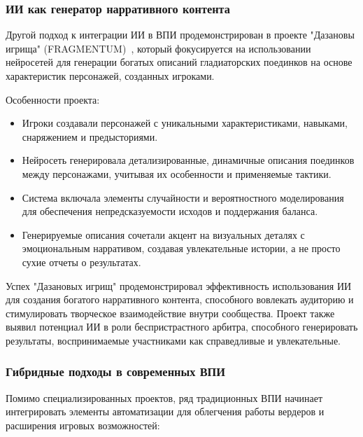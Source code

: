 \subsubsection{ИИ как генератор нарративного контента}

Другой подход к интеграции ИИ в ВПИ продемонстрирован в проекте "{}Дазановы игрища"{} (FRAGMENTUM)~\cite{fragmentum}, который фокусируется на использовании нейросетей для генерации богатых описаний гладиаторских поединков на основе характеристик персонажей, созданных игроками.

Особенности проекта:

\begin{itemize}
    \item Игроки создавали персонажей с уникальными характеристиками, навыками, снаряжением и предысториями.

    \item Нейросеть генерировала детализированные, динамичные описания поединков между персонажами, учитывая их особенности и применяемые тактики.

    \item Система включала элементы случайности и вероятностного моделирования для обеспечения непредсказуемости исходов и поддержания баланса.

    \item Генерируемые описания сочетали акцент на визуальных деталях с эмоциональным нарративом, создавая увлекательные истории, а не просто сухие отчеты о результатах.
\end{itemize}

Успех "{}Дазановых игрищ"{} продемонстрировал эффективность использования ИИ для создания богатого нарративного контента, способного вовлекать аудиторию и стимулировать творческое взаимодействие внутри сообщества. Проект также выявил потенциал ИИ в роли беспристрастного арбитра, способного генерировать результаты, воспринимаемые участниками как справедливые и увлекательные.

\subsubsection{Гибридные подходы в современных ВПИ}

Помимо специализированных проектов, ряд традиционных ВПИ начинает интегрировать элементы автоматизации для облегчения работы вердеров и расширения игровых возможностей:


